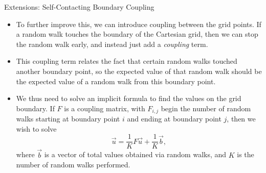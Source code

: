 \documentclass{beamer}
\newcommand\mat[1]{#1}
\begin{document}
\begin{frame}{Extensions: Self-Contacting Boundary Coupling}
\begin{itemize}
\item To further improve this,
we can introduce coupling between the grid points.
If a random walk touches the boundary of the Cartesian grid,
then we can stop the random walk early,
and instead just add a \emph{coupling} term.
\item This coupling term relates the fact that certain random walks
touched another boundary point, so the expected value of that random walk
should be the expected value of a random walk from this boundary point.
\item We thus need to solve an implicit formula
to find the values on the grid boundary.
If $\mat{F}$ is a coupling matrix,
with $F_{i,j}$ begin the number of random walks
starting at boundary point $i$ and ending at boundary point $j$,
then we wish to solve
$$\vec{u}=\frac{1}{K}\mat{F}\vec{u}+\frac{1}{K}\vec{b},$$
where $\vec{b}$ is a vector of total values obtained via random walks,
and $K$ is the number of random walks performed.
\end{itemize}
\end{frame}
\end{document}
